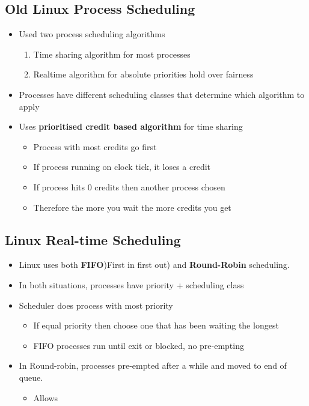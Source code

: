\documentclass{article}
\begin{document}
	\subsection{Old Linux Process Scheduling}
		\begin{itemize}
			\item Used two process scheduling algorithms
			\begin{enumerate}
				\item Time sharing algorithm for most processes
				\item Realtime algorithm for absolute priorities hold over fairness
			\end{enumerate}
			\item Processes have different scheduling classes that determine which algorithm to apply
			\item Uses \textbf{prioritised credit based algorithm} for time sharing
			\begin{itemize}
				\item Process with most credits go first
				\item If process running on clock tick, it loses a credit
				\item If process hits 0 credits then another process chosen
				\item Therefore the more you wait the more credits you get
			\end{itemize}
		\end{itemize}

	\subsection{Linux Real-time Scheduling}
		\begin{itemize}
			\item Linux uses both \textbf{FIFO})First in first out) and \textbf{Round-Robin} scheduling.
			\item In both situations, processes have priority + scheduling class
			\item Scheduler does process with most priority
			\begin{itemize}
				\item If equal priority then choose one that has been waiting the longest
				\item FIFO processes run until exit or blocked, no pre-empting

			\end{itemize}
			\item In Round-robin, processes pre-empted after a while and moved to end of queue.
			\begin{itemize}
				\item Allows
			\end{itemize}
		\end{itemize}
\end{document}
